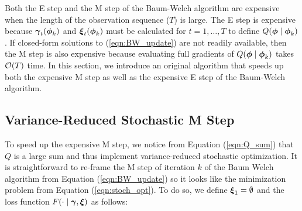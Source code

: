 Both the E step and the M step of the Baum-Welch algorithm are expensive when the length of the observation sequence ($T$) is large. The E step is expensive because $\boldsymbol{\gamma}_t(\boldsymbol{\phi}_{k})$ and $\boldsymbol{\xi}_t(\boldsymbol{\phi}_{k})$ must be calculated for $t = 1,\ldots,T$ to define $Q(\boldsymbol{\phi} \mid \boldsymbol{\phi}_k)$. If closed-form solutions to (\ref{eqn:BW_update}) are not readily available, then the M step is also expensive because evaluating full gradients of $Q(\boldsymbol{\phi} \mid \boldsymbol{\phi}_{k})$ takes $\mathcal{O}(T)$ time. In this section, we introduce an original algorithm that speeds up both the expensive M step as well as the expensive E step of the Baum-Welch algorithm. %

\subsection{Variance-Reduced Stochastic M Step}
\label{subsec:stoch_M}

To speed up the expensive M step, we notice from Equation (\ref{eqn:Q_sum}) that $Q$ is a large sum and thus implement variance-reduced stochastic optimization. It is straightforward to re-frame the M step of iteration $k$ of the Baum Welch algorithm from Equation (\ref{eqn:BW_update}) so it looks like the minimization problem from Equation (\ref{eqn:stoch_opt}). To do so, we define $\boldsymbol{\xi}_1 = \emptyset$ and the loss function $F(\cdot \mid \boldsymbol{\gamma},\boldsymbol{\xi})$ as follows:

